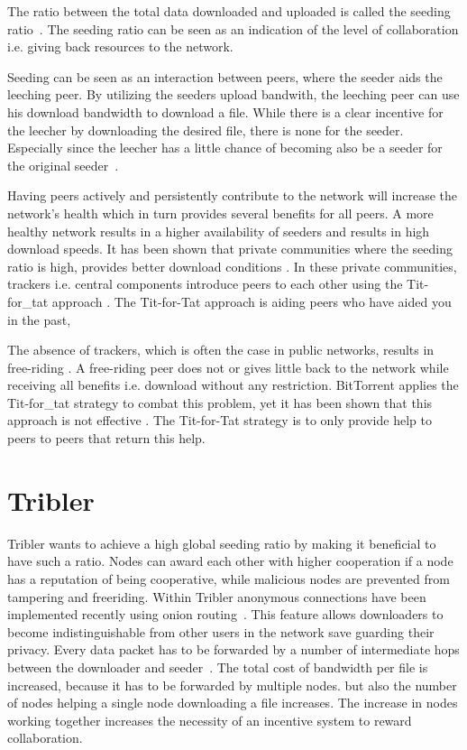 The ratio between the total data downloaded and uploaded is called the seeding ratio~\cite{Cohen-bittorrent}.
The seeding ratio can be seen as an indication of the level of collaboration i.e. giving back resources to the network.

Seeding can be seen as an interaction between peers, where the seeder aids the leeching peer.
By utilizing the seeders upload bandwith, the leeching peer can use his download bandwidth to download a file.
While there is a clear incentive for the leecher by downloading the desired file, there is none for the seeder.
Especially since the leecher has a little chance of becoming also be a seeder for the original seeder~\cite{Lai-Incentives}.

Having peers actively and persistently contribute to the network will increase the network's health which in turn provides several benefits for all peers.
A more healthy network results in a higher availability of seeders and results in high download speeds.
It has been shown that private communities where the seeding ratio is high, provides better download conditions \cite{meulpolder-privatecommunities}.
In these private communities, trackers i.e. central components introduce peers to each other using the Tit-for_tat approach \cite{cohen-titfortat}.
The Tit-for-Tat approach is aiding peers who have aided you in the past, 

The absence of trackers, which is often the case in public networks, results in free-riding \cite{Adar-Freeriding}.
A free-riding peer does not or gives little back to the network while receiving all benefits i.e. download without any restriction.
BitTorrent applies the Tit-for_tat strategy to combat this problem, yet it has been shown that this approach is not effective \cite{Pouwelse-tribler}.
The Tit-for-Tat strategy is to only provide help to peers to peers that return this help.

\section{Tribler}

Tribler wants to achieve a high global seeding ratio by making it beneficial to have such a ratio.
Nodes can award each other with higher cooperation if a node has a reputation of being cooperative,
while malicious nodes are prevented from tampering and freeriding.
Within Tribler anonymous connections have been implemented recently using onion routing~\cite{Plak-anonymous,ruigrok-anonymous,tanaskoski-anonymous}.
This feature allows downloaders to become indistinguishable from other users in the network save guarding their privacy.
Every data packet has to be forwarded
by a number of intermediate hops between the downloader and seeder~\cite{Plak-anonymous,tanaskoski-anonymous}.
The total cost of bandwidth per file is increased,
because it has to be forwarded by multiple nodes.
but also the number of nodes helping a single node downloading a file increases.
The increase in nodes working together increases the necessity of an incentive system to reward collaboration.

